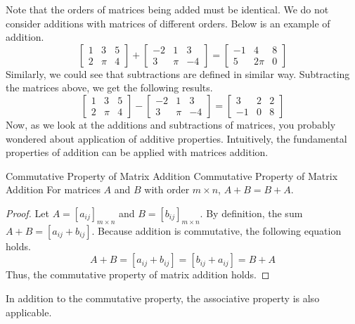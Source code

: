 \documentclass[../main.tex]{subfiles}
\begin{document}
Note that the orders of matrices being added must be identical.
We do not consider additions with matrices of different orders.
Below is an example of addition.
\[
\begin{bmatrix}
    1 & 3   & 5 \\
    2 & \pi & 4
\end{bmatrix}
+
\begin{bmatrix}
    -2 & 1   & 3 \\
    3  & \pi & -4
\end{bmatrix}
=
\begin{bmatrix}
    -1 & 4    & 8 \\
    5  & 2\pi & 0
\end{bmatrix}
\]
Similarly, we could see that subtractions are defined in similar
way. Subtracting the matrices above, we get the following results.
\[
\begin{bmatrix}
    1 & 3   & 5 \\
    2 & \pi & 4
\end{bmatrix}
-
\begin{bmatrix}
    -2 & 1   & 3 \\
    3  & \pi & -4
\end{bmatrix}
=
\begin{bmatrix}
    3  & 2 & 2 \\
    -1 & 0 & 8
\end{bmatrix}
\]
Now, as we look at the additions and subtractions of matrices,
you probably wondered about application of additive properties.
Intuitively, the fundamental properties of addition can be
applied with matrices addition.

\begin{theorem}{Commutative Property of Matrix Addition}
{Commutative Property of Matrix Addition}
For matrices $A$ and $B$ with order $m \times n$, $A + B = B + A$.
\end{theorem}
\begin{proof}
Let $A = [a_{ij}]_{m \times n}$ and $B = [b_{ij}]_{m \times n}$.
By definition, the sum $A + B = [a_{ij} + b_{ij}]$. Because
addition is commutative, the following equation holds.
\[
A + B
= [a_{ij} + b_{ij}]
= [b_{ij} + a_{ij}]
= B + A
\]
Thus, the commutative property of matrix addition holds.
\end{proof}

In addition to the commutative property, the associative property
is also applicable.
\end{document}
